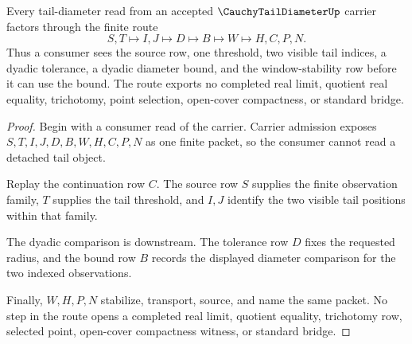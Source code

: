 \begin{theorem}
\label{thm:cauchy-tail-diameter-tail-window-handoff}
Every tail-diameter read from an accepted $\CauchyTailDiameterUp$ carrier factors through the finite route
$$
S,T \longmapsto I,J \longmapsto D \longmapsto B \longmapsto W \longmapsto H,C,P,N .
$$
Thus a consumer sees the source row, one threshold, two visible tail indices, a dyadic tolerance, a dyadic diameter bound, and the window-stability row before it can use the bound. The route exports no completed real limit, quotient real equality, trichotomy, point selection, open-cover compactness, or standard bridge.
\end{theorem}
\begin{proof}
Begin with a consumer read of the carrier. Carrier admission exposes $S,T,I,J,D,B,W,H,C,P,N$ as one finite packet, so the consumer cannot read a detached tail object.

Replay the continuation row $C$. The source row $S$ supplies the finite observation family, $T$ supplies the tail threshold, and $I,J$ identify the two visible tail positions within that family.

The dyadic comparison is downstream. The tolerance row $D$ fixes the requested radius, and the bound row $B$ records the displayed diameter comparison for the two indexed observations.

Finally, $W,H,P,N$ stabilize, transport, source, and name the same packet. No step in the route opens a completed real limit, quotient equality, trichotomy row, selected point, open-cover compactness witness, or standard bridge.
\end{proof}

